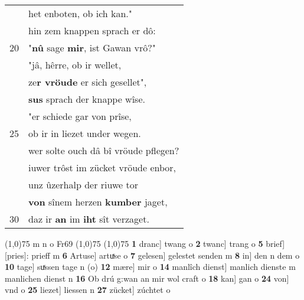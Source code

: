 \documentclass[8pt,a4paper,notitlepage]{article}
\begin{document}
\begin{table}[ht]
\begin{minipage}[t]{0.5\linewidth}
\begin{tabular}{rl}
 & het enboten, ob ich kan."\\ 
 & hin zem knappen sprach er dô:\\ 
20 & "\textbf{nû} sage \textbf{mir}, ist Gawan vrô?"\\ 
 & "jâ, hêrre, ob ir wellet,\\ 
 & ze\textbf{r vröude} er sich gesellet",\\ 
 & \textbf{sus} sprach der knappe wîse.\\ 
 & "er schiede gar von prîse,\\ 
25 & ob ir in liezet under wegen.\\ 
 & wer solte ouch dâ bî vröude pflegen?\\ 
 & iuwer trôst im zücket vröude enbor,\\ 
 & unz ûzerhalp der riuwe tor\\ 
 & \textbf{von} sînem herzen \textbf{kumber} jaget,\\ 
30 & daz ir \textbf{an} im \textbf{iht} sît verzaget.\\ 
\end{tabular}
\scriptsize
\line(1,0){75} \newline
m n o Fr69 \newline
\line(1,0){75} \newline
\newline
\line(1,0){75} \newline
\textbf{1} dranc] twang o \textbf{2} twanc] trang o \textbf{5} brief] [pries]: prieff m \textbf{6} Artuse] artuͯse o \textbf{7} gelesen] gelestet senden m \textbf{8} in] den n dem o \textbf{10} tage] suͯssen tage n (o) \textbf{12} mære] mir o \textbf{14} manlîch dienst] manlich dienste m manlichen dienst n \textbf{16} Ob drú g:wan an mir wol craft o \textbf{18} kan] gan o \textbf{24} von] vnd o \textbf{25} liezet] liessen n \textbf{27} zücket] zúchtet o \newline
\end{minipage}
\end{table}
\newpage
\end{document}
